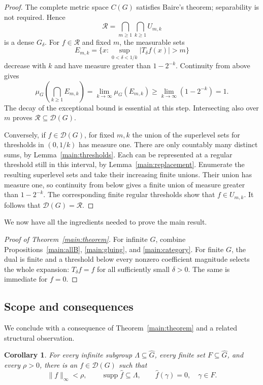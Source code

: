 \documentclass[11pt]{amsart}
\newtheorem{corollary}[theorem]{Corollary}
\theoremstyle{definition}
\theoremstyle{remark}
\newcommand{\supp}{\operatorname{supp}}
\newcommand{\D}{\mathcal D}
\begin{document}
\begin{proof}
The complete metric space \(C(G)\) satisfies Baire's theorem;
separability is not required. Hence
\[
 \mathcal R=\bigcap_{m\geq1}\bigcap_{k\geq1}U_{m,k}
\]
is a dense \(G_\delta\).
For \(f\in\mathcal R\) and fixed \(m\), the measurable sets
\[
 E_{m,k}=\{x:\sup_{0<\delta<1/k}|T_\delta f(x)|>m\}
\]
decrease with \(k\) and have measure greater than \(1-2^{-k}\).
Continuity from above gives
\[
 \mu_G\left(\bigcap_{k\geq1}E_{m,k}\right)
 =\lim_{k\to\infty}\mu_G(E_{m,k})
 \geq\lim_{k\to\infty}(1-2^{-k})=1.
\]
The decay of the exceptional bound is essential at this step.
Intersecting also over \(m\) proves \(\mathcal R\subseteq\D(G)\).

Conversely, if \(f\in\D(G)\), for fixed \(m,k\) the union of
the superlevel sets for thresholds in \((0,1/k)\) has measure one.
There are only countably many distinct sums, by
Lemma~\ref{main:thresholds}. Each can be represented at a regular
threshold still in this interval, by Lemma~\ref{main:replacement}.
Enumerate the resulting superlevel sets and take their increasing
finite unions. Their union has measure one, so continuity from below
gives a finite union of measure greater than \(1-2^{-k}\). The
corresponding finite regular thresholds show that \(f\in U_{m,k}\).
It follows that \(\D(G)=\mathcal R\).
\end{proof}

We now have all the ingredients needed to prove the main result.
\begin{proof}[Proof of Theorem~\ref{main:theorem}]
For infinite \(G\), combine Propositions~\ref{main:allB},
\ref{main:gluing}, and \ref{main:category}.
For finite \(G\), the dual is finite and a threshold below every
nonzero coefficient magnitude selects the whole expansion:
\(T_\delta f=f\) for all sufficiently small \(\delta>0\).
The same is immediate for \(f=0\).
\end{proof}

\subsection{Scope and consequences}
We conclude with a consequence of Theorem~\ref{main:theorem} and a
related structural observation.
\begin{corollary}\label{main:subgroup}
For every infinite subgroup \(\Lambda\subseteq\widehat G\), every
finite set \(F\subseteq\widehat G\), and every \(\rho>0\), there is an
\(f\in\D(G)\) such that
\[
 \|f\|_\infty<\rho,\qquad
 \supp\widehat f\subseteq\Lambda,
 \qquad \widehat f(\gamma)=0,\quad \gamma\in F.
\]
\end{corollary}
\end{document}

